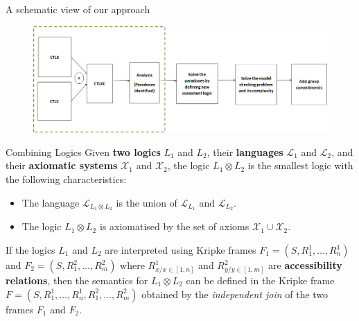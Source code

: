 \documentclass{beamer}
\begin{document}
\begin{frame}{A schematic view of our approach}

\begin{figure}[htbp]
\centering
\includegraphics[width=1.05 \columnwidth]{figures/figure9.png}
\end{figure}

\end{frame}

    \begin{frame}{Combining Logics}
Given \textbf{two logics} $L_1$ and $L_2$, their \textbf{languages} $\mathcal{L}_1$ and $\mathcal{L}_2$, and their
\textbf{axiomatic systems} $\mathcal{X}_1$ and $\mathcal{X}_2$, the logic
$L_1 \otimes L_2$ is the smallest logic with the following
characteristics:
\begin{itemize}
  \item The language $\mathcal{L}_{L_1\otimes L_2}$ is the union of $\mathcal{L}_{L_1}$ and $\mathcal{L}_{L_2}$.
  \item The logic $L_1 \otimes L_2$ is axiomatised by the set of axioms $\mathcal{X}_1 \cup \mathcal{X}_2$.
\end{itemize}
If the logics $L_1$ and $L_2$ are interpreted using Kripke frames
$F_1 = (S, R_1^1, \dots, R_n^1)$ and $F_2 = (S, R_1^2, \dots
,R_m^2 )$ where $R^1_{x/x\in[1,n]}$ and $R^2_{y/y\in[1,m]}$ are
\textbf{accessibility relations}, then the semantics for $L_1 \otimes L_2$
can be defined in the Kripke frame $F =(S, R_1^1, \dots , R_n^1,
R_1^2, \dots ,R_m^2 )$ obtained by the \textit{independent join} of the two
frames $F_1$ and $F_2$.
    \end{frame}
\end{document}
